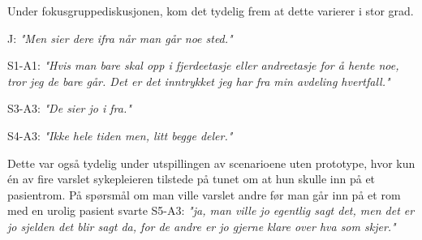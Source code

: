 \noindent
Under fokusgruppediskusjonen, kom det tydelig frem at dette varierer i stor grad.

\noindent
J: \emph{"Men sier dere ifra når man går noe sted."}

\noindent
S1-A1: \emph{"Hvis man bare skal opp i fjerdeetasje eller andreetasje for å hente noe, tror jeg de bare går. Det er det inntrykket jeg har fra min avdeling hvertfall."} 

\noindent
S3-A3: \emph{"De sier jo i fra."}

\noindent
S4-A3: \emph{"Ikke hele tiden men, litt begge deler."}

\noindent
Dette var også tydelig under utspillingen av scenarioene uten prototype, hvor kun én av fire varslet sykepleieren tilstede på tunet om at hun skulle inn på et pasientrom. På spørsmål om man ville varslet andre før man går inn på et rom med en urolig pasient svarte S5-A3: \emph{"ja, man ville jo egentlig sagt det, men det er jo sjelden det blir sagt da, for de andre er jo gjerne klare over hva som skjer."} 

